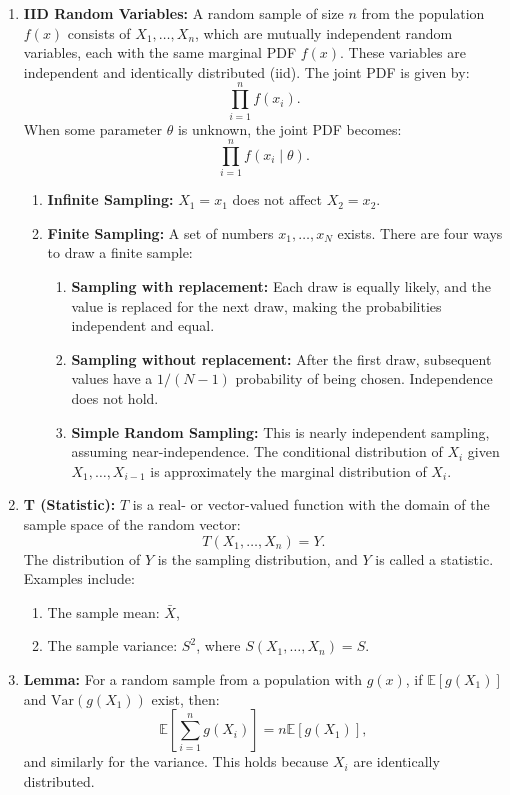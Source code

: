 \documentclass{article}
\begin{document}
\begin{enumerate}
    \item \textbf{IID Random Variables:} A random sample of size \(n\) from the population \(f(x)\) consists of \(X_1, \dots, X_n\), which are mutually independent random variables, each with the same marginal PDF \(f(x)\). These variables are independent and identically distributed (iid). The joint PDF is given by:
    \[
    \prod_{i=1}^n f(x_i).
    \]
    When some parameter \(\theta\) is unknown, the joint PDF becomes:
    \[
    \prod_{i=1}^n f(x_i \mid \theta).
    \]
    \begin{enumerate}
        \item \textbf{Infinite Sampling:} \(X_1 = x_1\) does not affect \(X_2 = x_2\).
        \item \textbf{Finite Sampling:} A set of numbers \(x_1, \dots, x_N\) exists. There are four ways to draw a finite sample:
        \begin{enumerate}
            \item \textbf{Sampling with replacement:} Each draw is equally likely, and the value is replaced for the next draw, making the probabilities independent and equal.
            \item \textbf{Sampling without replacement:} After the first draw, subsequent values have a \(1/(N-1)\) probability of being chosen. Independence does not hold.
            \item \textbf{Simple Random Sampling:} This is nearly independent sampling, assuming near-independence. The conditional distribution of \(X_i\) given \(X_1, \dots, X_{i-1}\) is approximately the marginal distribution of \(X_i\).
        \end{enumerate}
    \end{enumerate}

    \item \textbf{T (Statistic):} \(T\) is a real- or vector-valued function with the domain of the sample space of the random vector:
    \[
    T(X_1, \dots, X_n) = Y.
    \]
    The distribution of \(Y\) is the sampling distribution, and \(Y\) is called a statistic. Examples include:
    \begin{enumerate}
        \item The sample mean: \(\bar{X}\),
        \item The sample variance: \(S^2\), where \(S(X_1, \dots, X_n) = S\).
    \end{enumerate}

    \item \textbf{Lemma:} For a random sample from a population with \(g(x)\), if \(\mathbb{E}[g(X_1)]\) and \(\text{Var}(g(X_1))\) exist, then:
    \[
    \mathbb{E}\left[\sum_{i=1}^n g(X_i)\right] = n \mathbb{E}[g(X_1)],
    \]
    and similarly for the variance. This holds because \(X_i\) are identically distributed.


\end{enumerate}
\end{document}
